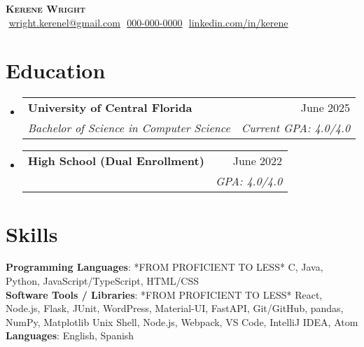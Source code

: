 \documentclass[letterpaper,11pt]{article}
\makeatletter
\newcommand{\resumeSubheading}[4]{
  \vspace{-2pt}\item
    \begin{tabular*}{0.97\textwidth}[t]{l@{\extracolsep{\fill}}r}
      \textbf{#1} & #2 \\
      \textit{\small#3} & \textit{\small #4} \\
    \end{tabular*}\vspace{-7pt}
}
\newcommand{\resumeSubHeadingListStart}{\begin{itemize}[leftmargin=0.15in, label={}]}
\newcommand{\resumeSubHeadingListEnd}{\end{itemize}}
\makeatother
\begin{document}
\begin{flushright}
  \vspace{-4pt}
\end{flushright}

\vspace{-7pt}

\begin{center}
    \textbf{\Huge \scshape Kerene Wright} \\ \vspace{8pt}
    \small 
    \faEnvelope$  $
    \href{mailto:wright.kerenel@gmail.com}
    {\underline{wright.kerenel@gmail.com}}
    \faPhone$  $
    \underline{000-000-0000}
    \faLinkedin$  $
    \href{https://www.linkedin.com/in/kerene-wright-985581182/}{\underline{linkedin.com/in/kerene}} $  $
\end{center}

\section{Education}
  \resumeSubHeadingListStart
  
    \resumeSubheading
      {University of Central Florida}{June 2025}
      {Bachelor of Science in Computer Science}{Current GPA: 4.0/4.0}
      
    \resumeSubheading
      {High School \footnotesize{(Dual Enrollment)}}{June 2022}
      {}{GPA: 4.0/4.0}

  \resumeSubHeadingListEnd

\section{Skills}
 \begin{itemize}[leftmargin=0.15in, label={}]
    \small{\item{
    
     \textbf{Programming Languages}{: *FROM PROFICIENT TO LESS* C, Java, Python, JavaScript/TypeScript, HTML/CSS} \\
     
     \textbf{Software Tools / Libraries}{: *FROM PROFICIENT TO LESS* React, Node.js, Flask, JUnit, WordPress, Material-UI, FastAPI, Git/GitHub, pandas, NumPy, Matplotlib Unix Shell, Node.js, Webpack, VS Code, IntelliJ IDEA, Atom} \\

     \textbf{Languages}{: English, Spanish} \\
     
    }}
 \end{itemize}
\end{document}
